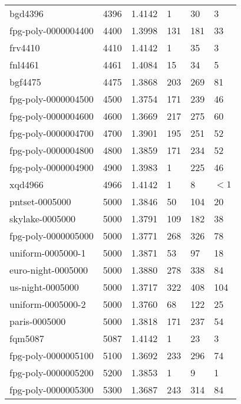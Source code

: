 \begin{longtable}{|lrrlll|}
bgd4396 & 4396 & \num{1.4142} & \num{1} & \num{30} & \num{3} \\
fpg-poly-0000004400 & 4400 & \num{1.3998} & \num{131} & \num{181} & \num{33} \\
frv4410 & 4410 & \num{1.4142} & \num{1} & \num{35} & \num{3} \\
fnl4461 & 4461 & \num{1.4084} & \num{15} & \num{34} & \num{5} \\
bgf4475 & 4475 & \num{1.3868} & \num{203} & \num{269} & \num{81} \\
fpg-poly-0000004500 & 4500 & \num{1.3754} & \num{171} & \num{239} & \num{46} \\
fpg-poly-0000004600 & 4600 & \num{1.3669} & \num{217} & \num{275} & \num{60} \\
fpg-poly-0000004700 & 4700 & \num{1.3901} & \num{195} & \num{251} & \num{52} \\
fpg-poly-0000004800 & 4800 & \num{1.3859} & \num{171} & \num{234} & \num{52} \\
fpg-poly-0000004900 & 4900 & \num{1.3983} & \num{1} & \num{225} & \num{46} \\
xqd4966 & 4966 & \num{1.4142} & \num{1} & \num{8} & $<1$ \\
pntset-0005000 & 5000 & \num{1.3846} & \num{50} & \num{104} & \num{20} \\
skylake-0005000 & 5000 & \num{1.3791} & \num{109} & \num{182} & \num{38} \\
fpg-poly-0000005000 & 5000 & \num{1.3771} & \num{268} & \num{326} & \num{78} \\
uniform-0005000-1 & 5000 & \num{1.3871} & \num{53} & \num{97} & \num{18} \\
euro-night-0005000 & 5000 & \num{1.3880} & \num{278} & \num{338} & \num{84} \\
us-night-0005000 & 5000 & \num{1.3717} & \num{322} & \num{408} & \num{104} \\
uniform-0005000-2 & 5000 & \num{1.3760} & \num{68} & \num{122} & \num{25} \\
paris-0005000 & 5000 & \num{1.3818} & \num{171} & \num{237} & \num{54} \\
fqm5087 & 5087 & \num{1.4142} & \num{1} & \num{23} & \num{3} \\
fpg-poly-0000005100 & 5100 & \num{1.3692} & \num{233} & \num{296} & \num{74} \\
fpg-poly-0000005200 & 5200 & \num{1.3853} & \num{1} & \num{9} & \num{1} \\
fpg-poly-0000005300 & 5300 & \num{1.3687} & \num{243} & \num{314} & \num{84} \\

\end{longtable}
